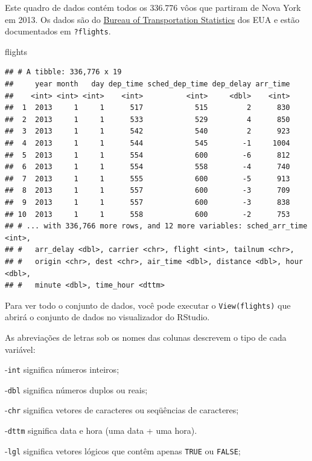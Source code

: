 \documentclass[a4paper]{book}
\newenvironment{Shaded}{\begin{snugshade}}{\end{snugshade}}
\newcommand{\NormalTok}[1]{#1}
\begin{document}
Este quadro de dados contém todos os 336.776 vôos que partiram de Nova York em 2013. Os dados são do \href{https://www.transtats.bts.gov/DatabaseInfo.asp?DB_ID=120\&Link=0}{Bureau of Transportation Statistics} dos EUA e estão documentados em \texttt{?flights}.

\begin{Shaded}
\begin{Highlighting}[]
\NormalTok{flights}
\end{Highlighting}
\end{Shaded}

\begin{verbatim}
## # A tibble: 336,776 x 19
##     year month   day dep_time sched_dep_time dep_delay arr_time
##    <int> <int> <int>    <int>          <int>     <dbl>    <int>
##  1  2013     1     1      517            515         2      830
##  2  2013     1     1      533            529         4      850
##  3  2013     1     1      542            540         2      923
##  4  2013     1     1      544            545        -1     1004
##  5  2013     1     1      554            600        -6      812
##  6  2013     1     1      554            558        -4      740
##  7  2013     1     1      555            600        -5      913
##  8  2013     1     1      557            600        -3      709
##  9  2013     1     1      557            600        -3      838
## 10  2013     1     1      558            600        -2      753
## # ... with 336,766 more rows, and 12 more variables: sched_arr_time <int>,
## #   arr_delay <dbl>, carrier <chr>, flight <int>, tailnum <chr>,
## #   origin <chr>, dest <chr>, air_time <dbl>, distance <dbl>, hour <dbl>,
## #   minute <dbl>, time_hour <dttm>
\end{verbatim}

Para ver todo o conjunto de dados, você pode executar o \texttt{View(flights)} que abrirá o conjunto de dados no visualizador do RStudio.

As abreviações de letras sob os nomes das colunas descrevem o tipo de cada variável:

-\texttt{int} significa números inteiros;

-\texttt{dbl} significa números duplos ou reais;

-\texttt{chr} significa vetores de caracteres ou seqüências de caracteres;

-\texttt{dttm} significa data e hora (uma data + uma hora).

-\texttt{lgl} significa vetores lógicos que contêm apenas \texttt{TRUE} ou \texttt{FALSE};
\end{document}
